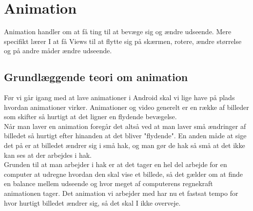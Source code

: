 
\chapter{Animation}
Animation handler om at få ting til at bevæge sig og ændre udseende. Mere specifikt lærer I at få Views til at flytte sig på skærmen, rotere, ændre størrelse og på andre måder ændre udseende.
\section{Grundlæggende teori om animation}
Før vi går igang med at lave animationer i Android skal vi lige have på plads hvordan animationer virker.
Animationer og video generelt er en række af billeder som skifter så hurtigt at det ligner en flydende bevægelse. \\
Når man laver en animation foregår det altså ved at man laver små ændringer af billedet så hurtigt efter hinanden at det bliver "flydende". En anden måde at sige det på er at billedet ændrer sig i små hak, og man gør de hak så små at det ikke kan ses at der arbejdes i hak. \\
Grunden til at man arbejder i hak er at det tager en hel del arbejde for en computer  at udregne hvordan den skal vise et billede, så det gælder om at finde en balance mellem udseende og hvor meget af computerens regnekraft animationen tager. Det animation vi arbejder med har nu et fastsat tempo for hvor hurtigt billedet ændrer sig, så det skal I ikke overveje.
